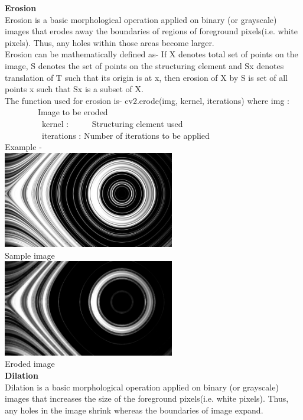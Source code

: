 \documentclass{article}
\begin{document}
\begin{flushleft}
	\huge \textbf{Erosion} \\
	\large
	Erosion is a basic morphological operation applied on binary (or grayscale) images that erodes away the boundaries of regions of foreground pixels(i.e. white pixels). Thus, any holes within those areas become larger.
	\\ Erosion can be mathematically defined as- If X denotes total set of points on the image, S denotes the set of points on the structuring element and Sx denotes translation of T such that its origin is at x, then erosion of X by S is set of all points x such that Sx is a subset of X. \\
	The function used for erosion is- cv2.erode(img, kernel, iterations)  where img : \ \ \ \ \ \ \ \  Image to be eroded\\
	\ \ \ \ \ \ \ \ \        kernel : \ \ \ \ \ Structuring element used  \\
	\ \ \ \ \ \ \ \ \      iterations : Number of iterations to be applied \\
	Example - \\
	\includegraphics[width = 75mm]{music.jpg} \\
	\small Sample image \\
	\includegraphics[width = 75mm]{Eroded.jpg} \\
	\small Eroded image \\
	\huge \textbf{Dilation} \\
	\large
	Dilation is a basic morphological operation applied on binary (or grayscale) images that increases the size of the foreground pixels(i.e. white pixels). Thus, any holes in the image shrink whereas the boundaries of image expand. \\

\end{flushleft}
\end{document}
